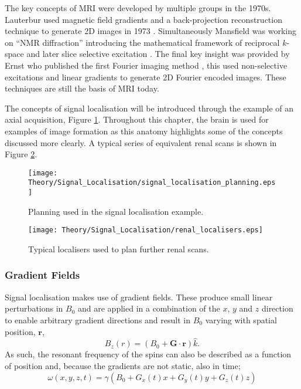 The key concepts of \ac{MRI} were developed by multiple groups in the 1970s. Lauterbur used magnetic field gradients and a back-projection reconstruction technique to generate 2D images in 1973 \cite{lauterbur_image_1973}. Simultaneously Mansfield was working on ``\ac{NMR} diffraction'' introducing the mathematical framework of reciprocal $k$-space \cite{mansfield_nmr_1973} and later slice selective excitation \cite{garroway_image_1974}. The final key insight was provided by Ernst who published the first Fourier imaging method \cite{kumar_nmr_1975}, this used non-selective excitations and linear gradients to generate 2D Fourier encoded images. These techniques are still the basis of \ac{MRI} today.

The concepts of signal localisation will be introduced through the example of an axial acquisition, Figure \ref{fig:theory_axial_planning}. Throughout this chapter, the brain is used for examples of image formation as this anatomy highlights some of the concepts discussed more clearly. A typical series of equivalent renal scans is shown in Figure \ref{fig:theory_renal_localisers}.
\begin{figure}[H]
	\centering
	\texttt{[image: Theory/Signal\_Localisation/signal\_localisation\_planning.eps]}
	\caption{Planning used in the signal localisation example.}
	\label{fig:theory_axial_planning}	
\end{figure}

\begin{figure}[H]
	\centering
	\texttt{[image: Theory/Signal\_Localisation/renal\_localisers.eps]}
	\caption{Typical localisers used to plan further renal scans.}
	\label{fig:theory_renal_localisers}	
\end{figure}
\subsubsection{Gradient Fields}
Signal localisation makes use of gradient fields. These produce small linear perturbations in $B_0$ and are applied in a combination of the $x$, $y$ and $z$ direction to enable arbitrary gradient directions and result in $B_0$ varying with spatial position, $\mathbf{r}$,
\begin{equation}
B_z\left( r\right) =\left( B_0 + \mathbf{G \cdot r}\right) \hat{k}.
\end{equation}
As such, the resonant frequency of the spins can also be described as a function of position and, because the gradients are not static, also in time;
\begin{equation}
\omega\left( x, y, z, t \right) = \gamma \left( B_0 + G_x(t)x + G_y(t)y + G_z(t)z \right) 
\label{eq:theory_localisation_gradients}
\end{equation}


